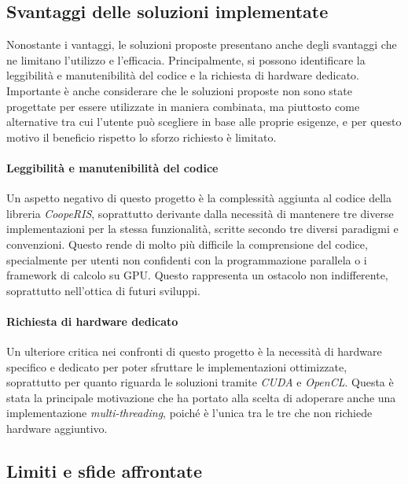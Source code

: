\subsection{Svantaggi delle soluzioni implementate}
\label{sec:svantaggi}

Nonostante i vantaggi, le soluzioni proposte presentano anche degli svantaggi
che ne limitano l'utilizzo e l'efficacia. Principalmente, si possono
identificare la leggibilità e manutenibilità del codice e la richiesta di
hardware dedicato. Importante è anche considerare che le soluzioni proposte non sono
state progettate per essere utilizzate in maniera combinata, ma piuttosto come
alternative tra cui l'utente può scegliere in base alle proprie esigenze, e per questo
motivo il beneficio rispetto lo sforzo richiesto è limitato.

\paragraph{Leggibilità e manutenibilità del codice}
\label{para:leggibilita}

Un aspetto negativo di questo progetto è la complessità aggiunta al codice della
libreria \textit{CoopeRIS}, soprattutto derivante dalla necessità di mantenere tre
diverse implementazioni per la stessa funzionalità, scritte secondo tre diversi
paradigmi e convenzioni. Questo rende di molto più difficile la comprensione del
codice, specialmente per utenti non confidenti con la programmazione parallela o
i framework di calcolo su GPU. Questo rappresenta un ostacolo non indifferente,
soprattutto nell'ottica di futuri sviluppi.

\paragraph{Richiesta di hardware dedicato}
\label{para:hardware}

Un ulteriore critica nei confronti di questo progetto è la necessità di hardware
specifico e dedicato per poter sfruttare le implementazioni ottimizzate, soprattutto
per quanto riguarda le soluzioni tramite \textit{CUDA} e \textit{OpenCL}. Questa
è stata la principale motivazione che ha portato alla scelta di adoperare anche
una implementazione \textit{multi-threading}, poiché è l'unica tra le tre che
non richiede hardware aggiuntivo.

\subsection{Limiti e sfide affrontate}
\label{subsec:limiti}

